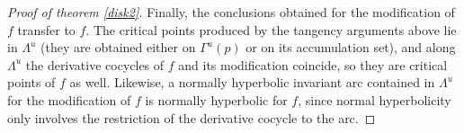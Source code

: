 \documentclass[a4paper,11pt]{article}
\theoremstyle{definition}
\def\La{\Lambda}
\def\e{\epsilon}
\def\Ga{\Gamma}
\def\La{\Lambda}
\def\Ga{\Gamma}
\begin{document}
\begin{proof}[Proof of theorem \ref{disk2}]
Finally, the conclusions obtained for the modification of $f$ transfer to $f$. The critical
points produced by the tangency arguments above lie in $\La^u$ (they are
obtained either on $\Ga^u(p)$ or on its accumulation set), and along
$\La^u$ the derivative cocycles of $f$ and its modification coincide, so they are
critical points of $f$ as well. Likewise, a normally hyperbolic invariant
arc contained in $\La^u$ for the modification of $f$  is normally hyperbolic for $f$, since
normal hyperbolicity only involves the restriction of the derivative cocycle
to the arc.

\end{proof}





\end{document}
